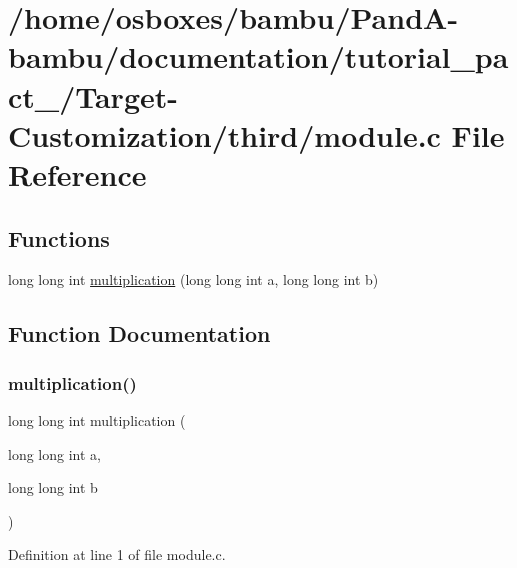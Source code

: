 \hypertarget{tutorial__pact__2019_2Target-Customization_2third_2module_8c}{}\section{/home/osboxes/bambu/\+Pand\+A-\/bambu/documentation/tutorial\+\_\+pact\+\_/\+Target-\/\+Customization/third/module.c File Reference}
\label{tutorial__pact__2019_2Target-Customization_2third_2module_8c}
\subsection*{Functions}
\begin{DoxyCompactItemize}
\item 
long long int \hyperlink{tutorial__pact__2019_2Target-Customization_2third_2module_8c_af7a373e176b9b2c01ac378680636fbe2}{multiplication} (long long int a, long long int b)
\end{DoxyCompactItemize}


\subsection{Function Documentation}
\mbox{\label{tutorial__pact__2019_2Target-Customization_2third_2module_8c_af7a373e176b9b2c01ac378680636fbe2}} 
\subsubsection{\texorpdfstring{multiplication()}{multiplication()}}
{\footnotesize\ttfamily long long int multiplication (\begin{DoxyParamCaption}\item[{long long int}]{a,  }\item[{long long int}]{b }\end{DoxyParamCaption})}



Definition at line 1 of file module.\+c.

